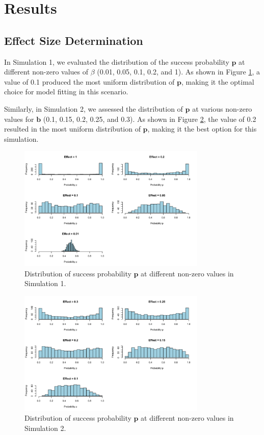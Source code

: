 \documentclass[12pt]{article}
\begin{document}
\section{Results}

\subsection{Effect Size Determination}

In Simulation 1, we evaluated the distribution of the success probability \( \mathbf{p} \) at different non-zero values of \( \beta \) (0.01, 0.05, 0.1, 0.2, and 1). As shown in Figure \ref{fig:sim1_p_dist}, a value of 0.1 produced the most uniform distribution of \( \mathbf{p} \), making it the optimal choice for model fitting in this scenario.

Similarly, in Simulation 2, we assessed the distribution of \( \mathbf{p} \) at various non-zero values for \( \mathbf{b} \) (0.1, 0.15, 0.2, 0.25, and 0.3). As shown in Figure \ref{fig:sim2_p_dist}, the value of 0.2 resulted in the most uniform distribution of \( \mathbf{p} \), making it the best option for this simulation.

\begin{figure}[H]
	\centering
	\includegraphics[width=0.8\textwidth]{sim1_p_dist.png}
  \caption{Distribution of success probability \( \mathbf{p} \) at different non-zero values in Simulation 1.}
	\label{fig:sim1_p_dist}
\end{figure}

\begin{figure}[H]
	\centering
	\includegraphics[width=0.8\textwidth]{sim2_p_dist.png}
  \caption{Distribution of success probability \( \mathbf{p} \) at different non-zero values in Simulation 2.}
	\label{fig:sim2_p_dist}
\end{figure}
\end{document}
